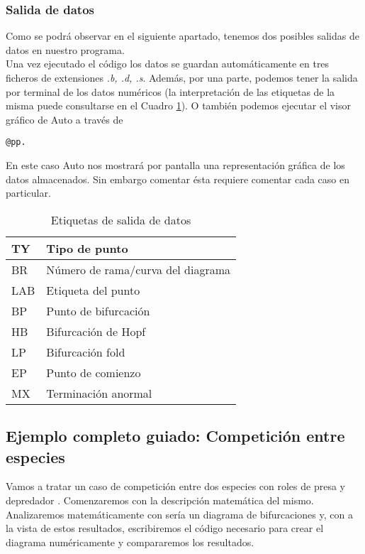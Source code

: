  \subsubsection{Salida de datos}
 Como se podrá observar en el siguiente apartado, tenemos dos posibles salidas de datos en nuestro programa.\\
 Una vez ejecutado el código los datos se guardan automáticamente en tres ficheros de extensiones \emph{.b, .d, .s}.
 Además, por una parte, podemos tener la salida por terminal de los datos numéricos (la interpretación de las etiquetas de la misma puede consultarse en el Cuadro \ref{dd}). O también podemos ejecutar el visor gráfico de Auto a través de \begin{lstlisting}
@pp.
 \end{lstlisting}
  En este caso Auto nos mostrará por pantalla una representación gráfica de los datos almacenados. Sin embargo comentar ésta requiere comentar cada caso en particular.
 
 \begin{table}[h]
 	\begin{center}
 		\begin{tabular}{|l|l|}
 			\hline
 		    TY & Tipo de punto \\ \hline
 			BR & Número de rama/curva del diagrama \\ \hline
 			LAB & Etiqueta del punto \\ \hline \hline 
 			BP & Punto de bifurcación\\ \hline
 			HB & Bifurcación de Hopf\\ \hline
 			LP & Bifurcación fold\\ \hline
 			EP & Punto de comienzo\\ \hline
 			MX & Terminación anormal\\ \hline
 			
 		\end{tabular}
 		\caption{Etiquetas de salida de datos}
 		\label{dd}
 	\end{center}
 \end{table}
 
\subsection{Ejemplo completo guiado: Competición entre especies}
Vamos a tratar un caso de competición entre dos especies con roles de presa y depredador \cite{doedel}. Comenzaremos con la descripción matemática del mismo. Analizaremos matemáticamente con sería un diagrama de bifurcaciones y, con a la vista de estos resultados, escribiremos el código necesario para crear el diagrama numéricamente y compararemos los resultados.

